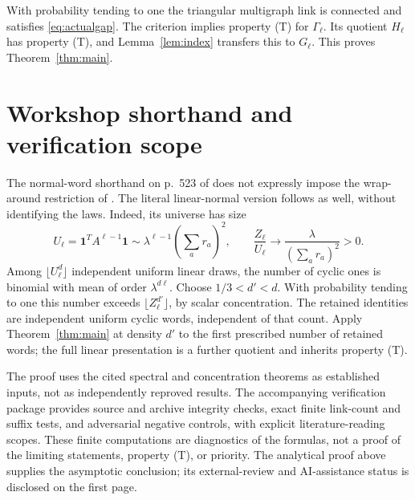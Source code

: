 \documentclass[11pt,letterpaper]{article}
\newcommand{\one}{\mathbf 1}
\begin{document}
With probability tending to one the triangular multigraph link is connected and satisfies \eqref{eq:actualgap}. The criterion \cite[Theorem 2.13]{kk} implies property (T) for $\Gamma_\ell$. Its quotient $H_\ell$ has property (T), and Lemma~\ref{lem:index} transfers this to $G_\ell$. This proves Theorem~\ref{thm:main}.

\section{Workshop shorthand and verification scope}
The normal-word shorthand on p.~523 of \cite{owr} does not expressly impose the wrap-around restriction of \cite[Definition 1.1]{rqfp}. The literal linear-normal version follows as well, without identifying the laws. Indeed, its universe has size
\[
 U_\ell=\one^T A^{\ell-1}\one\sim
 \lambda^{\ell-1}\left(\sum_a r_a\right)^2,
 \qquad \frac{Z_\ell}{U_\ell}\longrightarrow
 \frac{\lambda}{(\sum_a r_a)^2}>0.
\]
Among $\lfloor U_\ell^d\rfloor$ independent uniform linear draws, the number of cyclic ones is binomial with mean of order $\lambda^{d\ell}$. Choose $1/3<d'<d$. With probability tending to one this number exceeds $\lfloor Z_\ell^{d'}\rfloor$, by scalar concentration. The retained identities are independent uniform cyclic words, independent of that count. Apply Theorem~\ref{thm:main} at density $d'$ to the first prescribed number of retained words; the full linear presentation is a further quotient and inherits property (T).

The proof uses the cited spectral and concentration theorems as established inputs, not as independently reproved results. The accompanying verification package provides source and archive integrity checks, exact finite link-count and suffix tests, and adversarial negative controls, with explicit literature-reading scopes. These finite computations are diagnostics of the formulas, not a proof of the limiting statements, property (T), or priority. The analytical proof above supplies the asymptotic conclusion; its external-review and AI-assistance status is disclosed on the first page.
\end{document}
